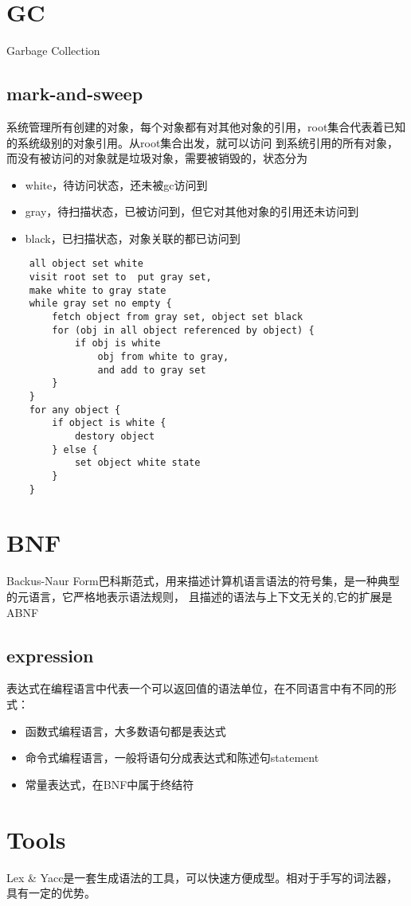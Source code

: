 \section{GC}

Garbage Collection

\subsection{mark-and-sweep}
系统管理所有创建的对象，每个对象都有对其他对象的引用，root集合代表着已知的系统级别的对象引用。从root集合出发，就可以访问
到系统引用的所有对象，而没有被访问的对象就是垃圾对象，需要被销毁的，状态分为
\begin{itemize}
    \item {white，待访问状态，还未被gc访问到}
    \item {gray，待扫描状态，已被访问到，但它对其他对象的引用还未访问到}
    \item {black，已扫描状态，对象关联的都已访问到}
\end{itemize}
\begin{lstlisting}
    all object set white
    visit root set to  put gray set,
    make white to gray state 
    while gray set no empty {
        fetch object from gray set, object set black 
        for (obj in all object referenced by object) {
            if obj is white 
                obj from white to gray, 
                and add to gray set 
        }
    }
    for any object {
        if object is white {
            destory object 
        } else {
            set object white state
        }
    }
\end{lstlisting}

\section{BNF}
Backus-Naur Form巴科斯范式，用来描述计算机语言语法的符号集，是一种典型的元语言，它严格地表示语法规则，
且描述的语法与上下文无关的,它的扩展是ABNF 
\cite{ABNF}

\subsection{expression}
表达式在编程语言中代表一个可以返回值的语法单位，在不同语言中有不同的形式：
\begin{itemize}
    \item {函数式编程语言，大多数语句都是表达式}
    \item {命令式编程语言，一般将语句分成表达式和陈述句statement}
    \item {常量表达式，在BNF中属于终结符}
\end{itemize}

\section{Tools}
Lex \& Yacc是一套生成语法的工具，可以快速方便成型。相对于手写的词法器，具有一定的优势。
